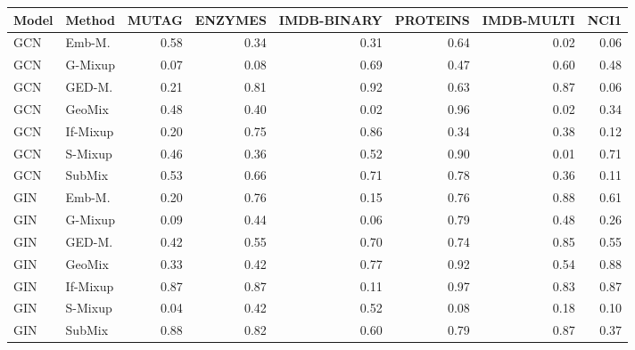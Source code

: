 
\begin{tabular}{llrrrrrr}
\toprule
Model & Method & MUTAG & ENZYMES & IMDB-BINARY & PROTEINS & IMDB-MULTI & NCI1\\
\midrule
GCN & Emb-M. & 0.58 & 0.34 & 0.31 & 0.64 & 0.02 & 0.06\\
GCN & G-Mixup & 0.07 & 0.08 & 0.69 & 0.47 & 0.60 & 0.48\\
GCN & GED-M. & 0.21 & 0.81 & 0.92 & 0.63 & 0.87 & 0.06\\
GCN & GeoMix & 0.48 & 0.40 & 0.02 & 0.96 & 0.02 & 0.34\\
GCN & If-Mixup & 0.20 & 0.75 & 0.86 & 0.34 & 0.38 & 0.12\\
GCN & S-Mixup & 0.46 & 0.36 & 0.52 & 0.90 & 0.01 & 0.71\\
GCN & SubMix & 0.53 & 0.66 & 0.71 & 0.78 & 0.36 & 0.11\\
GIN & Emb-M. & 0.20 & 0.76 & 0.15 & 0.76 & 0.88 & 0.61\\
GIN & G-Mixup & 0.09 & 0.44 & 0.06 & 0.79 & 0.48 & 0.26\\
GIN & GED-M. & 0.42 & 0.55 & 0.70 & 0.74 & 0.85 & 0.55\\
GIN & GeoMix & 0.33 & 0.42 & 0.77 & 0.92 & 0.54 & 0.88\\
GIN & If-Mixup & 0.87 & 0.87 & 0.11 & 0.97 & 0.83 & 0.87\\
GIN & S-Mixup & 0.04 & 0.42 & 0.52 & 0.08 & 0.18 & 0.10\\
GIN & SubMix & 0.88 & 0.82 & 0.60 & 0.79 & 0.87 & 0.37\\
\bottomrule
\end{tabular}
